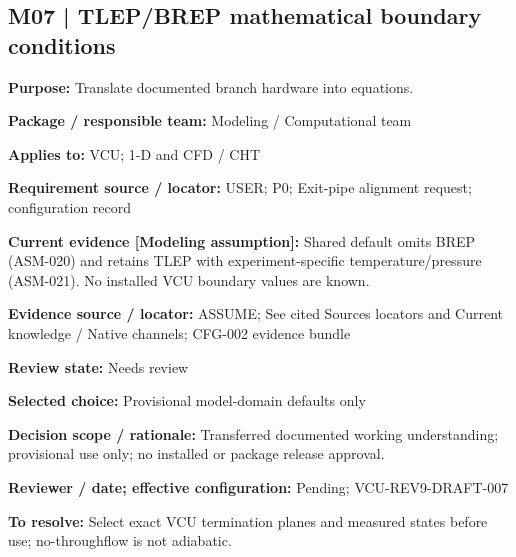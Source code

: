 \documentclass[11pt]{article}
\begin{document}
\par\noindent\begin{minipage}{\textwidth}\small\setlength{\parskip}{2pt}
\subsection*{M07 | TLEP/BREP mathematical boundary conditions}
\textbf{Purpose:} Translate documented branch hardware into equations.\par
\textbf{Package / responsible team:} Modeling / Computational team\par
\textbf{Applies to:} VCU; 1-D and CFD / CHT\par
\textbf{Requirement source / locator:} USER; P0; Exit-pipe alignment request; configuration record\par
\textbf{Current evidence [Modeling assumption]:} Shared default omits BREP (ASM-020) and retains TLEP with experiment-specific temperature/pressure (ASM-021). No installed VCU boundary values are known.\par
\textbf{Evidence source / locator:} ASSUME; See cited Sources locators and Current knowledge / Native channels; CFG-002 evidence bundle\par
\textbf{Review state:} Needs review\par
\textbf{Selected choice:} Provisional model-domain defaults only\par
\textbf{Decision scope / rationale:} Transferred documented working understanding; provisional use only; no installed or package release approval.\par
\textbf{Reviewer / date; effective configuration:} Pending; VCU-REV9-DRAFT-007\par
\textbf{To resolve:} Select exact VCU termination planes and measured states before use; no-throughflow is not adiabatic.\par
\end{minipage}\par\vspace{5pt}
\end{document}
